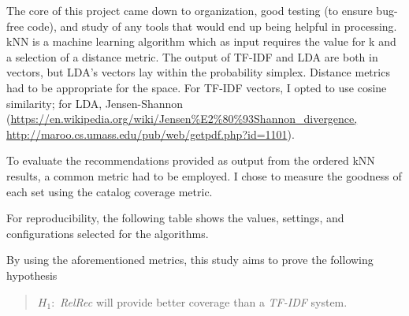 The core of this project came down to organization, good testing (to ensure bug-free code), and study of any tools that would end up being helpful in processing. kNN is a machine learning algorithm which as input requires the value for k and a selection of a distance metric. The output of TF-IDF and LDA are both in vectors, but LDA’s vectors lay within the probability simplex. Distance metrics had to be appropriate for the space. For TF-IDF vectors, I opted to use cosine similarity; for LDA, Jensen-Shannon (\url{https://en.wikipedia.org/wiki/Jensen%E2%80%93Shannon_divergence, http://maroo.cs.umass.edu/pub/web/getpdf.php?id=1101}). %

To evaluate the recommendations provided as output from the ordered kNN results, a common metric had to be employed. I chose to measure the goodness of each set using the catalog coverage metric. %

For reproducibility, the following table shows the values, settings, and configurations selected for the algorithms.

By using the aforementioned metrics, this study aims to prove the following hypothesis
	\begin{quote}
		$H_{1}:$ \emph{RelRec} will provide better coverage than a \emph{TF-IDF} system.

	\end{quote}
